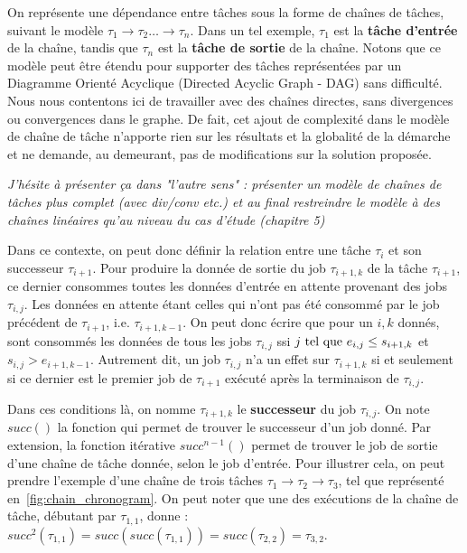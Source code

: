 \documentclass[french, a4paper, 11pt, twoside, pdftex]{StyleThese}
\begin{document}
    
    On représente une dépendance entre tâches sous la forme de chaînes de tâches, suivant le modèle $\tau_{1} \rightarrow \tau_2 \ldots \rightarrow \tau_n$. Dans un tel exemple, $\tau_1$ est la \textbf{tâche d'entrée} de la chaîne, tandis que $\tau_n$ est la \textbf{tâche de sortie} de la chaîne. Notons que ce modèle peut être étendu pour supporter des tâches représentées par un Diagramme Orienté Acyclique (Directed Acyclic Graph - DAG) sans difficulté. Nous nous contentons ici de travailler avec des chaînes directes, sans divergences ou convergences dans le graphe. De fait, cet ajout de complexité dans le modèle de chaîne de tâche n'apporte rien sur les résultats et la globalité de la démarche et ne demande, au demeurant, pas de modifications sur la solution proposée. 
    
    \textit{J'hésite à présenter ça dans "l'autre sens" : présenter un modèle de chaînes de tâches plus complet (avec div/conv etc.) et au final restreindre le modèle à des chaînes linéaires qu'au niveau du cas d'étude (chapitre 5)}
     
    Dans ce contexte, on peut donc définir la relation entre une tâche $\tau_i$ et son successeur $\tau_{i+1}$. Pour produire la donnée de sortie du job $\tau_{i+1,k}$ de la tâche $\tau_{i+1}$, ce dernier consommes toutes les données d'entrée en attente provenant des jobs $\tau_{i,j}$. Les données en attente étant celles qui n'ont pas été consommé par le job précédent de $\tau_{i+1}$, i.e. $\tau_{i+1,k-1}$. On peut donc écrire que pour un $i,k$ donnés, sont consommés les données de tous les jobs $\tau_{i,j}$ ssi $j \textup{ tel que } e_{i,j} \leq s_{i+1, k}$ et $s_{i,j} > e_{i+1, k-1}$. Autrement dit, un job $\tau_{i,j}$ n'a un effet sur $\tau_{i+1,k}$ si et seulement si ce dernier est le premier job de $\tau_{i+1}$ exécuté après la terminaison de $\tau_{i,j}$.

    
    Dans ces conditions là, on nomme $\tau_{i+1,k}$ le \textbf{successeur} du job $\tau_{i,j}$. On note $succ()$ la fonction qui permet de trouver le successeur d'un job donné. Par extension, la fonction itérative $succ^{n-1}()$ permet de trouver le job de sortie d'une chaîne de tâche donnée, selon le job d'entrée. 
    Pour illustrer cela, on peut prendre l'exemple d'une chaîne de trois tâches $\tau_1 \rightarrow \tau_2 \rightarrow \tau_3$, tel que représenté en~\autoref{fig:chain_chronogram}. On peut noter que une des exécutions de la chaîne de tâche, débutant par $\tau_{1,1}$, donne : $succ^{2}(\tau_{1,1}) = succ(succ(\tau_{1,1})) = succ(\tau_{2,2}) = \tau_{3,2}$. %
\end{document}
